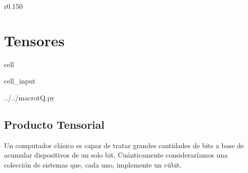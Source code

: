 \documentclass[letterpaper,10pt,english]{jupyterBook}
\begin{document}
\begin{wrapfigure}{r}{0.150\linewidth}
\centering
\noindent{}
\end{wrapfigure}


\section{Tensores}
\label{\detokenize{docs/Part_01_Formalismo/Chapter_01_02_Formalismo_matem_xe1tico/01_04_Tensores_myst:tensores}}\label{\detokenize{docs/Part_01_Formalismo/Chapter_01_02_Formalismo_matem_xe1tico/01_04_Tensores_myst::doc}}
\sphinxAtStartPar


\begin{sphinxuseclass}{cell}\begin{sphinxVerbatimInput}

\begin{sphinxuseclass}{cell_input}
\begin{sphinxVerbatim}[commandchars=\\\{\}]
 ../../macro\PYGZus{}tQ.py
 
   

   
   
   
   
   
\end{sphinxVerbatim}

\end{sphinxuseclass}\end{sphinxVerbatimInput}

\end{sphinxuseclass}

\subsection{Producto Tensorial}
\label{\detokenize{docs/Part_01_Formalismo/Chapter_01_02_Formalismo_matem_xe1tico/01_04_Tensores_myst:producto-tensorial}}
\sphinxAtStartPar
Un computador clásico es capaz de tratar grandes cantidades de bits a base de acumular dispositivos de un solo bit. Cuánticamente consideraríamos una colección de sistemas que, cada uno, implemente un cúbit.
\end{document}
